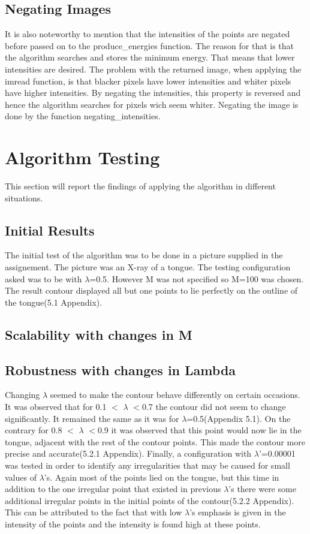 \documentclass[12pt,a4paper,twocolumn]{article}
\begin{document}
\subsection{Negating Images}
It is also noteworthy to mention that the intensities of the points are negated before passed on to the produce\_energies function. The reason for that is that the algorithm searches and stores the minimum energy. That means that lower intensities are desired. The problem with the returned image, when applying the imread function, is that blacker pixels have lower intensities and whiter pixels have higher intensities. By negating the intensities, this property is reversed and hence the algorithm searches for pixels wich seem whiter. Negating the image is done by the function negating\_intensities.
\section{Algorithm Testing}
This section will report the findings of applying the algorithm in different situations.
\subsection{Initial Results}
The initial test of the algorithm was to be done in a picture supplied in the assignement. The picture was an X-ray of a tongue. The testing configuration asked was to be with $\lambda$=0.5. However M was not specified so M=100 was chosen. The result contour displayed all but one points to lie perfectly on the outline of the tongue(5.1 Appendix).
\subsection{Scalability with changes in M}
\subsection{Robustness with changes in Lambda}
Changing $\lambda$ seemed to make the contour behave differently on certain occasions. 
It was observed that for 0.1 $<$ $\lambda$ $<$0.7 the contour did not seem to change significantly. It remained the same as it was for $\lambda$=0.5(Appendix 5.1).
On the contrary for 0.8 $<$ $\lambda$ $<$0.9 it was observed that this point would now lie in the tongue, adjacent with the rest of the contour points. This made the contour more precise and accurate(5.2.1 Appendix).
Finally, a configuration with $\lambda$'=0.00001 was tested in order to identify any irregularities that may be caused for small values of $\lambda$'s. Again most of the points lied on the tongue, but this time in addition to the one irregular point that existed in previous $\lambda$'s there were some additional irregular points in the initial points of the contour(5.2.2 Appendix). This can be attributed to the fact that with low $\lambda$'s emphasis is given in the intensity of the points and the intensity is found high at these points.
\end{document}
